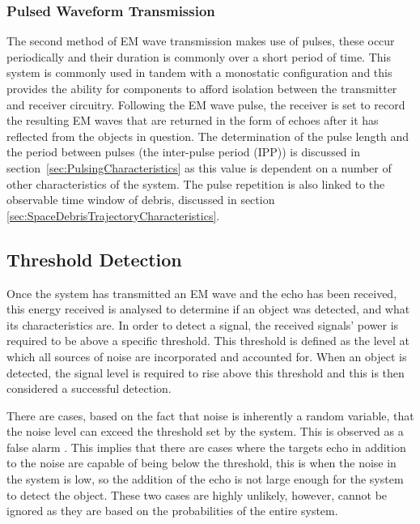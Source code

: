 \documentclass[11pt]{witseiepaper}
\begin{document}
\begin{bibunit}[witseie]
\subsubsection{Pulsed Waveform Transmission} \label{sec:PulsedWaveformTransmission}

The second method of EM wave transmission makes use of pulses, these occur periodically and their duration is commonly over a short period of time. This system is commonly used in tandem with a monostatic configuration and this provides the ability for components to afford isolation between the transmitter and receiver circuitry.
Following the EM wave pulse, the receiver is set to record the resulting EM waves that are returned in the form of echoes after it has reflected from the objects in question. The determination of the pulse length and the period between pulses (the inter-pulse period (IPP)) is discussed in section~\ref{sec:PulsingCharacteristics} as this value is dependent on a number of other characteristics of the system. The pulse repetition is also linked to the observable time window of debris, discussed in section \ref{sec:SpaceDebrisTrajectoryCharacteristics}.


\subsection{Threshold Detection} \label{sec:ThresholdDetection}
Once the system has transmitted an EM wave and the echo has been received, this energy received is analysed to determine if an object was detected, and what its characteristics are.
In order to detect a signal, the received signals' power is required to be above a specific threshold. This threshold is defined as the level at which all sources of noise are incorporated and accounted for. When an object is detected, the signal level is required to rise above this threshold and this is then considered a successful detection.

There are cases, based on the fact that noise is inherently a random variable, that the noise level can exceed the threshold set by the system. This is observed as a false alarm \cite[Ch~.3]{radarHandbook}.
This implies that there are cases where the targets echo in addition to the noise are capable of being below the threshold, this is when the noise in the system is low, so the addition of the echo is not large enough for the system to detect the object.
These two cases are highly unlikely, however, cannot be ignored as they are based on the probabilities of the entire system.


\end{bibunit}
\end{document}
